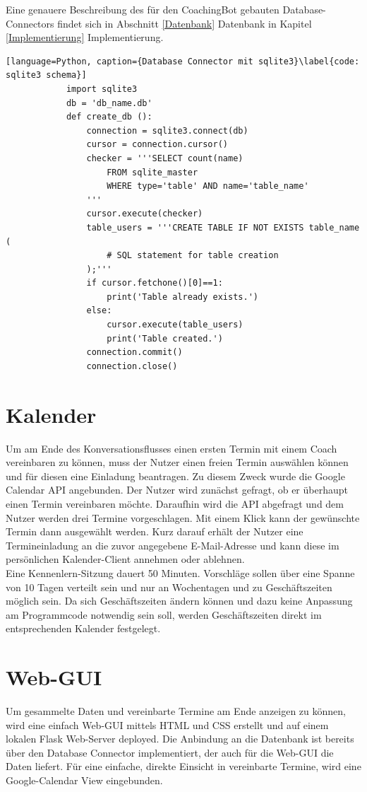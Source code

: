         Eine genauere Beschreibung des für den CoachingBot gebauten Database-Connectors findet sich in Abschnitt \ref*{Datenbank} Datenbank in Kapitel \ref*{Implementierung} Implementierung.

        \begin{lstlisting}[language=Python, caption={Database Connector mit sqlite3}\label{code: sqlite3 schema}]
            import sqlite3
            db = 'db_name.db'
            def create_db ():
                connection = sqlite3.connect(db)
                cursor = connection.cursor()
                checker = '''SELECT count(name)
                    FROM sqlite_master
                    WHERE type='table' AND name='table_name'
                '''
                cursor.execute(checker)
                table_users = '''CREATE TABLE IF NOT EXISTS table_name (
                    # SQL statement for table creation
                );'''
                if cursor.fetchone()[0]==1:
                    print('Table already exists.')
                else:
                    cursor.execute(table_users)
                    print('Table created.')
                connection.commit()
                connection.close()
        \end{lstlisting}


    \section{Kalender}
        Um am Ende des Konversationsflusses einen ersten Termin mit einem Coach vereinbaren zu können, muss der Nutzer einen freien Termin auswählen können und für diesen eine Einladung beantragen. Zu diesem Zweck wurde die Google Calendar API angebunden. Der Nutzer wird zunächst gefragt, ob er überhaupt einen Termin vereinbaren möchte. Daraufhin wird die API abgefragt und dem Nutzer werden drei Termine vorgeschlagen. Mit einem Klick kann der gewünschte Termin dann ausgewählt werden. Kurz darauf erhält der Nutzer eine Termineinladung an die zuvor angegebene E-Mail-Adresse und kann diese im persönlichen Kalender-Client annehmen oder ablehnen. \\
        Eine Kennenlern-Sitzung dauert 50 Minuten. Vorschläge sollen über eine Spanne von 10 Tagen verteilt sein und nur an Wochentagen und zu Geschäftszeiten möglich sein. Da sich Geschäftszeiten ändern können und dazu keine Anpassung am Programmcode notwendig sein soll, werden Geschäftszeiten direkt im entsprechenden Kalender festgelegt.

    
    \section{Web-GUI}
        Um gesammelte Daten und vereinbarte Termine am Ende anzeigen zu können, wird eine einfach Web-GUI mittels HTML und CSS erstellt und auf einem lokalen Flask Web-Server deployed. Die Anbindung an die Datenbank ist bereits über den Database Connector implementiert, der auch für die Web-GUI die Daten liefert. Für eine einfache, direkte Einsicht in vereinbarte Termine, wird eine Google-Calendar View eingebunden. 